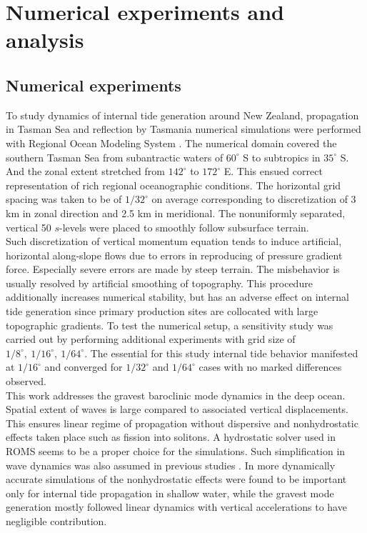 \documentclass[12pt]{article}
\begin{document}
\newpage

\section{Numerical experiments and analysis}
\subsection{Numerical experiments}
\label{C3.sec:model}
To study dynamics of internal tide generation around New Zealand, propagation in Tasman Sea and 
reflection by Tasmania  
numerical simulations were performed with Regional Ocean Modeling System 
\citep{shchepetkin2005regional}. 
The numerical domain covered the southern Tasman Sea from subantractic waters of $60^{\circ}$ S 
to subtropics in $35^{\circ}$ S. And the zonal extent stretched from $142^{\circ}$ to $172^{\circ}$ 
E. This ensued correct representation of rich regional oceanographic conditions. The horizontal 
grid spacing was taken to be of $1/32^{\circ}$ on average corresponding to discretization of 3 km 
in zonal direction and 2.5 km in meridional. The nonuniformly separated, vertical 50 $s$-levels 
were placed to smoothly follow subsurface terrain.\\
Such discretization of vertical momentum equation tends to induce artificial, horizontal  
along-slope flows \citep{haidvogel1999numerical} due to errors in reproducing of pressure 
gradient force. Especially severe errors are made by steep terrain. The misbehavior is usually 
resolved by artificial smoothing of topography. This procedure additionally increases numerical 
stability, but has an adverse effect on internal tide generation \citep{di2006numerical} since 
primary production sites are collocated with large topographic gradients. To test the numerical 
setup, a sensitivity study was carried out by performing additional experiments with grid size of   
$1/8^{\circ},~1/16^{\circ},~1/64^{\circ}$. The essential for this study 
internal tide behavior manifested at $1/16^{\circ}$ and converged for $1/32^{\circ}$ and 
$1/64^{\circ}$ cases with no marked differences observed.\\

This work addresses the gravest baroclinic mode dynamics in the deep ocean. Spatial 
extent of 
waves is large compared to associated vertical displacements. This ensures linear regime of 
propagation without dispersive and nonhydrostatic effects taken place such as fission into 
solitons. A hydrostatic solver used in ROMS seems to be a proper choice for the simulations. Such 
simplification in wave dynamics was also assumed in previous studies \citep{carter2008energetics, 
merrifield2001generation,  merrifield2002model, kerry2013effects}. In more dynamically 
accurate   
simulations of \citep{kang2012energetics, zhang2011three} the nonhydrostatic effects were found to 
be important only for internal tide propagation in shallow water, while the gravest mode generation 
mostly followed linear dynamics with vertical accelerations to have negligible contribution.\\
\end{document}
